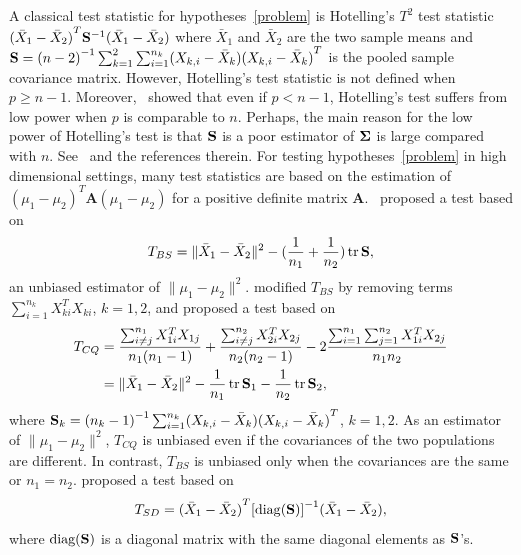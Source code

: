 \documentclass[3p]{elsarticle}
\DeclareMathOperator{\mytr}{tr}
\newcommand{\BA}{\mathbf{A}}    \newcommand{\BB}{\mathbf{B}}    \newcommand{\BC}{\mathbf{C}}    \newcommand{\BD}{\mathbf{D}}    \newcommand{\BE}{\mathbf{E}}    \newcommand{\BF}{\mathbf{F}}    \newcommand{\BG}{\mathbf{G}}    \newcommand{\BH}{\mathbf{H}}    \newcommand{\BI}{\mathbf{I}}    \newcommand{\BJ}{\mathbf{J}}    \newcommand{\BK}{\mathbf{K}}    \newcommand{\BL}{\mathbf{L}}
\theoremstyle{plain}
\theoremstyle{definition}
\theoremstyle{remark}
\begin{document}
A classical test statistic for hypotheses~\eqref{problem} is Hotelling's $T^2$ test  statistic ${(\bar{X}_1-\bar{X}_2)}^T \mathbf{S}^{-1}(\bar{X}_1-\bar{X}_2)$ where $\bar{X}_1$ and $\bar{X}_2$ are the two sample means and
    $
    \mathbf{S}=
{(n-2)}^{-1}\sum_{k=1}^2\sum_{i=1}^{n_k} (X_{k,i}-\bar{X}_k) {(X_{k,i}-\bar{X}_k)}^T
    $
is the pooled sample covariance matrix.
However, Hotelling's test statistic is not defined when $p\geq n-1$.
Moreover,~\cite{Bai1996Efiect} showed that even if $p<n-1$, Hotelling's test suffers from low power when $p$ is comparable to $n$.
Perhaps, the main reason for the low power of Hotelling's test is that $\mathbf{S}$ is a poor estimator of $\boldsymbol{\Sigma}$ is large compared with $n$.
See~\cite{Chen2010A} and the references therein.
For testing hypotheses~\eqref{problem} in high dimensional settings,  
many test statistics are based on the estimation of  ${(\mu_1-\mu_2)}^T \BA(\mu_1-\mu_2)$ for a positive definite matrix $\BA$.~\cite{Bai1996Efiect} proposed a test based on
\begin{equation*}
    T_{BS}=\|\bar{X}_1-\bar{X}_2\|^2-(\frac{1}{n_1}+\frac{1}{n_2})\mytr \BS,
\end{equation*}
an unbiased estimator of $\|\mu_1-\mu_2\|^2$.
\cite{Chen2010A} modified $T_{BS}$ by removing terms $\sum_{i=1}^{n_k}X_{ki}^T X_{ki}$, $k=1,2$, and proposed a test based on
\begin{equation*}
    \begin{aligned}
        T_{CQ}&=\frac{\sum_{i\neq j}^{n_1}X_{1i}^T X_{1j}}{n_1(n_1-1)}+\frac{\sum_{i\neq j}^{n_2}X_{2i}^T X_{2j}}{n_2(n_2-1)}-2\frac{\sum_{i=1}^{n_1}\sum_{j=1}^{n_2}X_{1i}^T X_{2j}}{n_1n_2}
        \\
            &=\|\bar{X}_1-\bar{X}_2\|^2-\frac{1}{n_1}\mytr \BS_1-\frac{1}{n_2}\mytr \BS_2,
    \end{aligned}
\end{equation*}
where
$\mathbf{S}_k={(n_k -1)}^{-1}\sum_{i=1}^{n_k} (X_{k,i}-\bar{X}_k) {(X_{k,i}-\bar{X}_k)}^T
$, $k=1,2$.
As an estimator of $\|\mu_1-\mu_2\|^2$, $T_{CQ}$ is unbiased even if the covariances of the two populations are different.
In contrast, $T_{BS}$ is unbiased only when the covariances are the same or $n_1=n_2$.
\cite{Srivastava2008A} proposed a test based on
\begin{equation*}
    T_{SD}={(\bar{X}_1-\bar{X}_2)}^T {[\mathrm{diag}(\mathbf{S})]}^{-1}(\bar{X}_1-\bar{X}_2),
\end{equation*}
where $\textrm{diag} (\mathbf{S})$ is a diagonal matrix with the same diagonal elements as $\mathbf{S}$'s.
\end{document}
